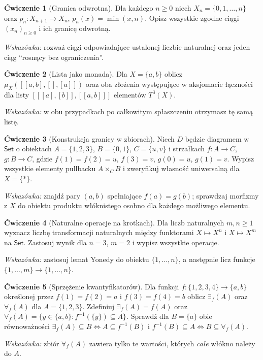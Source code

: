 \documentclass[11pt,a4paper]{article}
\numberwithin{equation}{section}
\theoremstyle{plain}
\theoremstyle{definition}
\newtheorem{cwiczenie}{Ćwiczenie}
\theoremstyle{remark}
\newcommand{\cat}[1]{\mathsf{#1}}
\newcommand{\Set}{\cat{Set}}
\begin{document}
\begin{cwiczenie}[Granica odwrotna]
Dla każdego $n\geq0$ niech $X_n=\{0,1,\ldots,n\}$ oraz $p_n:X_{n+1}\to X_n$, $p_n(x)=\min(x,n)$. Opisz wszystkie zgodne ciągi $(x_n)_{n\geq0}$ i ich granicę odwrotną.

\emph{Wskazówka:} rozważ ciągi odpowiadające ustalonej liczbie naturalnej oraz jeden ciąg ``rosnący bez ograniczenia''.
\end{cwiczenie}

\begin{cwiczenie}[Lista jako monada]
Dla $X=\{a,b\}$ oblicz $\mu_X([[a,b],[],[a]])$ oraz oba złożenia występujące w aksjomacie łączności dla listy $[[[a],[b]],[[a,b]]]$ elementów $T^3(X)$.

\emph{Wskazówka:} w obu przypadkach po całkowitym spłaszczeniu otrzymasz tę samą listę.
\end{cwiczenie}


\begin{cwiczenie}[Konstrukcja granicy w zbiorach]
Niech $D$ będzie diagramem w $\Set$ o obiektach $A=\{1,2,3\}$, $B=\{0,1\}$, $C=\{u,v\}$ i strzałkach $f:A\to C$, $g:B\to C$, gdzie $f(1)=f(2)=u$, $f(3)=v$, $g(0)=u$, $g(1)=v$. Wypisz wszystkie elementy pullbacku $A\times_C B$ i zweryfikuj własność uniwersalną dla $X=\{*\}$.

\emph{Wskazówka:} znajdź pary $(a,b)$ spełniające $f(a)=g(b)$; sprawdzaj morfizmy z $X$ do obiektu produktu włóknistego osobno dla każdego możliwego elementu.
\end{cwiczenie}

\begin{cwiczenie}[Naturalne operacje na krotkach]
Dla liczb naturalnych $m,n\geq1$ wyznacz liczbę transformacji naturalnych między funktorami $X\mapsto X^n$ i $X\mapsto X^m$ na $\Set$. Zastosuj wynik dla $n=3$, $m=2$ i wypisz wszystkie operacje.

\emph{Wskazówka:} zastosuj lemat Yonedy do obiektu $\{1,\ldots,n\}$, a następnie licz funkcje $\{1,\ldots,m\}\to\{1,\ldots,n\}$.
\end{cwiczenie}

\begin{cwiczenie}[Sprzężenie kwantyfikatorów]
Dla funkcji $f:\{1,2,3,4\}\to\{a,b\}$ określonej przez $f(1)=f(2)=a$ i $f(3)=f(4)=b$ oblicz $\exists_f(A)$ oraz $\forall_f(A)$ dla $A=\{1,2,3\}$. Zdefiniuj $\exists_f(A)=f(A)$ oraz $\forall_f(A)=\{y\in\{a,b\}:f^{-1}(\{y\})\subseteq A\}$. Sprawdź dla $B=\{a\}$ obie równoważności
$\exists_f(A)\subseteq B\iff A\subseteq f^{-1}(B)$ i
$f^{-1}(B)\subseteq A\iff B\subseteq\forall_f(A)$.

\emph{Wskazówka:} zbiór $\forall_f(A)$ zawiera tylko te wartości, których \emph{całe} włókno należy do $A$.
\end{cwiczenie}
\end{document}
